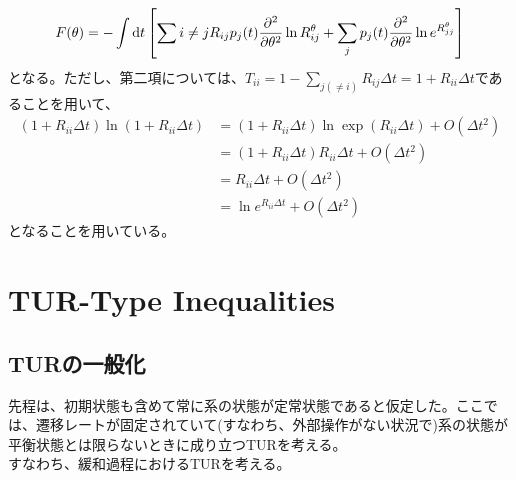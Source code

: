 \documentclass[a4paper,11pt]{jsarticle}
\numberwithin{equation}{section}
\begin{document}
\begin{align}
    F(\theta) = -\int \dd{t} \qty[\sum{i \neq j} R_{ij} p_j(t) \pdv[2]{\theta} \ln R_{ij}^\theta + \sum_j p_j(t) \pdv[2]{\theta} \ln e^{R_{jj}^\theta}]
\end{align}
となる。ただし、第二項については、$T_{ii} = 1-\sum_{j(\neq i)} R_{ij}\Delta t =1 + R_{ii} \Delta t$であることを用いて、
\begin{align}
    (1+R_{ii}\Delta t )\ln (1+R_{ii}\Delta t) &= (1+R_{ii}\Delta t )\ln \exp(R_{ii}\Delta t) + O(\Delta t^2)\\
    &= (1+R_{ii}\Delta t )R_{ii} \Delta t + O(\Delta t^2)\\
    &= R_{ii} \Delta t + O(\Delta t^2)\\
    &= \ln e^{R_{ii}\Delta t} + O(\Delta t^2)
\end{align}
となることを用いている。

\section{TUR-Type Inequalities}
\subsection{TURの一般化}
先程は、初期状態も含めて常に系の状態が定常状態であると仮定した。ここでは、遷移レートが固定されていて(すなわち、外部操作がない状況で)系の状態が平衡状態とは限らないときに成り立つTURを考える。\\
すなわち、緩和過程におけるTURを考える。
\end{document}
